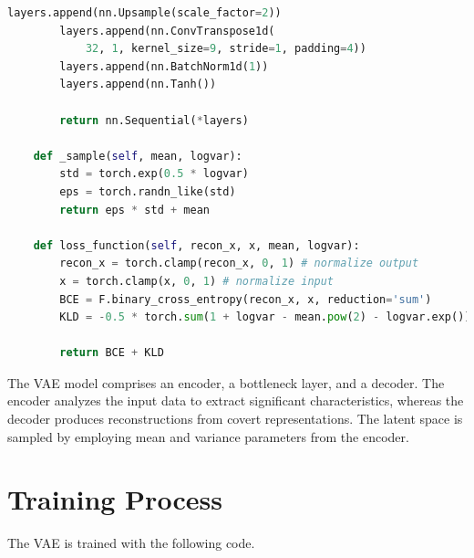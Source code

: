 \begin{lstlisting}[language=Python]
        layers.append(nn.Upsample(scale_factor=2))
        layers.append(nn.ConvTranspose1d(
            32, 1, kernel_size=9, stride=1, padding=4))
        layers.append(nn.BatchNorm1d(1))
        layers.append(nn.Tanh())

        return nn.Sequential(*layers)

    def _sample(self, mean, logvar):
        std = torch.exp(0.5 * logvar)
        eps = torch.randn_like(std)
        return eps * std + mean

    def loss_function(self, recon_x, x, mean, logvar):
        recon_x = torch.clamp(recon_x, 0, 1) # normalize output
        x = torch.clamp(x, 0, 1) # normalize input
        BCE = F.binary_cross_entropy(recon_x, x, reduction='sum')
        KLD = -0.5 * torch.sum(1 + logvar - mean.pow(2) - logvar.exp())

        return BCE + KLD
\end{lstlisting}

The \ac{VAE} model comprises an encoder, a bottleneck layer, and a decoder. The encoder analyzes the input data to extract significant characteristics, whereas the decoder produces reconstructions from covert representations. The latent space is sampled by employing mean and variance parameters from the encoder.

\section{Training Process}

The \ac{VAE} is trained with the following code.

